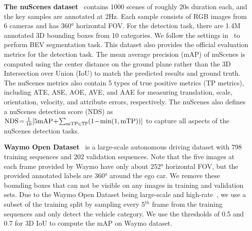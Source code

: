 \documentclass{article}
\begin{document}
\noindent\textbf{The nuScenes dataset}~\cite{caesar2020nuscenes} contains 1000 scenes of roughly 20s duration each, and the key samples are annotated at 2Hz. Each sample consists of RGB images from 6 cameras and has 360° horizontal FOV. For the detection task, there are  1.4M annotated 3D bounding boxes from 10 categories. We follow the settings in~\cite{philion2020lift}  to perform BEV segmentation task. 
This dataset also provides the official evaluation metrics for the detection task. The mean average precision (mAP) of nuScenes is computed using the center distance on the ground plane rather than the 3D Intersection over Union (IoU) to match the predicted results and ground truth. The nuScenes metrics also contain 5 types of true positive metrics (TP metrics), including ATE, ASE, AOE, AVE, and AAE for measuring translation, scale, orientation, velocity, and attribute errors, respectively. 
The nuScenes also defines a nuScenes detection score (NDS)
as ${\rm NDS}\!=\!\frac{1}{10}[5{\rm mAP}\!+\!\sum_{{\rm mTP}\in \mathbb{TP}} (1\!-\!{\rm min}(1,{\rm mTP}))]$ to capture all aspects of the nuScenes detection tasks.

\noindent\textbf{Waymo Open Dataset}~\cite{sun2020scalability}  is a large-scale autonomous driving dataset with 798 training sequences and 202 validation sequences. Note that the five images at each frame provided by Waymo have only about 252° horizontal FOV, but the provided annotated labels are 360° around the ego car. We remove these bounding boxes that can not be visible on any images in training and validation sets. Due to the Waymo Open Dataset being large-scale and high-rate~\cite{reading2021categorical}, we use a subset of the training split by sampling every 5$^{th}$ frame from the training sequences and only detect the vehicle category. 
We use the thresholds of 0.5 and 0.7 for 3D IoU to compute the mAP on Waymo dataset. 
\end{document}
